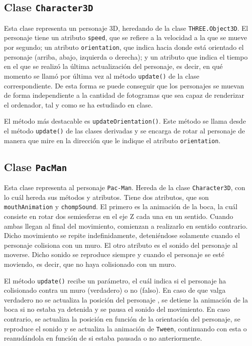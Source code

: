 \documentclass[11pt,a4paper]{article}
\begin{document}
\subsection{Clase \texttt{Character3D}}

Esta clase representa un personaje 3D, heredando de la clase \texttt{THREE.Object3D}. El personaje
tiene un atributo \texttt{speed}, que se refiere a la velocidad a la que se mueve por segundo;
un atributo \texttt{orientation}, que indica hacia donde está orientado el personaje (arriba,
abajo, izquierda o derecha); y un atributo que indica el tiempo en el que se realizó la última
actualización del personaje, es decir, en qué momento se llamó por última vez al método
\texttt{update()} de la clase correspondiente. De esta forma se puede conseguir que los
personajes se muevan de forma independiente a la cantidad de fotogramas que sea capaz de
renderizar el ordenador, tal y como se ha estudiado en clase.

El método más destacable es \texttt{updateOrientation()}. Este método se llama desde el método
\texttt{update()} de las clases derivadas y se encarga de rotar al personaje de manera que mire en
la dirección que le indique el atributo \texttt{orientation}.

\subsection{Clase \texttt{PacMan}}

Esta clase representa al personaje \texttt{Pac-Man}. Hereda de la clase \texttt{Character3D},
con lo cuál hereda sus métodos y atributos. Tiene dos atributos, que son \texttt{mouthAnimation}
y \texttt{chompSound}. El primero es la animación de la boca, la cuál consiste en rotar dos
semiesferas en el eje Z cada una en un sentido. Cuando ambas llegan al final del movimiento,
comienzan a realizarlo en sentido contrario. Dicho movimiento se repite indefinidamente,
deteniéndose solamente cuando el personaje colisiona con un muro. El otro atributo es el sonido
del personaje al moverse. Dicho sonido se reproduce siempre y cuando el personaje se esté
moviendo, es decir, que no haya colisionado con un muro.

El método \texttt{update()} recibe un parámetro, el cuál indica si el personaje ha colisionado
contra un muro (verdadero) o no (falso). En caso de que valga verdadero no se actualiza la
posición del personaje , se detiene la animación de la boca si no estaba ya detenida y se pausa
el sonido del movimiento. En caso contrario, se actualiza la posición en función de la
orientación del personaje, se reproduce el sonido y se actualiza la animación de \texttt{Tween},
continuando con esta o reanudándola en función de si estaba pausada o no anteriormente.
\end{document}

